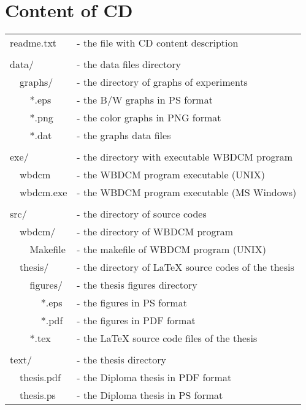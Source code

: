 \chapter{Content of CD}\label{app:CDcontent}

\begin{tabular}{llllll}
\multicolumn{5}{l}{readme.txt} & - the file with CD content description\\
&&&&&\\
\multicolumn{5}{l}{data/} & - the data files directory\\
& \multicolumn{4}{l}{graphs/} & - the directory of graphs of experiments\\
& & \multicolumn{3}{l}{*.eps} & - the B/W graphs in PS format\\
& & \multicolumn{3}{l}{*.png} & - the color graphs in PNG format\\
& & \multicolumn{3}{l}{*.dat} & - the graphs data files\\
&&&&&\\
\multicolumn{5}{l}{exe/} & - the directory with executable WBDCM program\\
& \multicolumn{4}{l}{wbdcm} & - the WBDCM program executable (UNIX)\\
& \multicolumn{4}{l}{wbdcm.exe} & - the WBDCM program executable (MS Windows)\\
&&&&&\\
\multicolumn{5}{l}{src/} & - the directory of source codes\\
& \multicolumn{4}{l}{wbdcm/}& - the directory of WBDCM program\\
& & \multicolumn{3}{l}{Makefile}& - the makefile of WBDCM program (UNIX)\\
& \multicolumn{4}{l}{thesis/} & - the directory of \LaTeX{} source codes of the thesis\\
& & \multicolumn{3}{l}{figures/} & - the thesis figures directory\\
& & & \multicolumn{2}{l}{*.eps} & - the figures in PS format\\
& & & \multicolumn{2}{l}{*.pdf} & - the figures in PDF format\\
& & \multicolumn{3}{l}{*.tex} & - the \LaTeX{} source code files of the thesis\\
&&&&&\\
\multicolumn{5}{l}{text/} & - the thesis directory\\
& \multicolumn{4}{l}{thesis.pdf} & - the Diploma thesis in PDF format\\
& \multicolumn{4}{l}{thesis.ps} & - the Diploma thesis in PS format\\
\end{tabular}